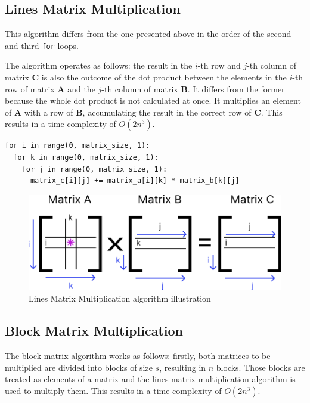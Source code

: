 \documentclass[sigconf,balance,nonacm]{acmart}
\begin{document}
\subsection{Lines Matrix Multiplication}

This algorithm differs from the one presented above in the order of the second and third \lstinline{for} loops.

The algorithm operates as follows: the result in the $i$-th row and $j$-th column of matrix $\mathbf{C}$ is also the outcome of the dot product between the elements in the $i$-th row of matrix $\mathbf{A}$ and the $j$-th column of matrix $\mathbf{B}$. It differs from the former because the whole dot product is not calculated at once. It multiplies an element of $\mathbf{A}$ with a row of $\mathbf{B}$, accumulating the result in the correct row of $\mathbf{C}$. This results in a time complexity of $O(2n^3)$.

\begin{minipage}{\linewidth}
    \begin{lstlisting}
for i in range(0, matrix_size, 1):
  for k in range(0, matrix_size, 1):
    for j in range(0, matrix_size, 1):
      matrix_c[i][j] += matrix_a[i][k] * matrix_b[k][j]
\end{lstlisting}
\end{minipage}

\begin{figure}[H]
    \centering
    \includegraphics[width=0.8\columnwidth]{figures/lines.png}
    \caption{Lines Matrix Multiplication algorithm illustration}
    \label{fig:lines_illustration}
\end{figure}

\subsection{Block Matrix Multiplication}

The block matrix algorithm works as follows: firstly, both matrices to be multiplied are divided into blocks of size $s$, resulting in $n$ blocks. Those blocks are treated as elements of a matrix and the lines matrix multiplication algorithm is used to multiply them. This results in a time complexity of $O(2n^3)$.
\end{document}
